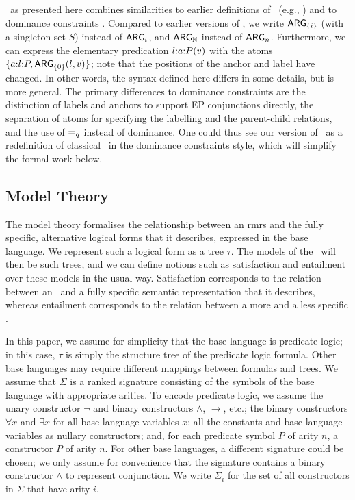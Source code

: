 \rmrs\ as presented here combines similarities to earlier definitions
of \rmrs\ (e.g., \cite{copestake:2003}) and to dominance constraints
\cite{egg:etal:2001}.  Compared to earlier versions of \rmrs, we write
$\mathsf{ARG}_{\{i\}}$ (with a singleton set $S$) instead of $\mathsf{ARG}_i$, and
$\mathsf{ARG}_{\mathbb{N}}$ instead of $\mathsf{ARG}_n$.  Furthermore, we can express the
elementary predication $l {:} a {:} P(v)$ with the atoms
$\{a {:} l {:} P, \mathsf{ARG}_{\{0\}}(l,v)\}$; note that the positions of the
anchor and label have changed.  In other words, the syntax defined
here differs in some details, but is more general. The primary
differences to dominance constraints are the distinction of labels and
anchors to support EP conjunctions directly, the separation of
atoms for specifying the labelling and the parent-child relations, and
the use of $=_q$ instead of dominance.  One could thus see our
version of \rmrs\ as a redefinition of classical \rmrs\ in the
dominance constraints style, which will simplify the formal work
below.




\subsection{Model Theory}

The model theory formalises the relationship between an {\sc rmrs} and
the fully specific, alternative logical forms that it describes,
expressed in the base language.  We represent such a logical form as a
tree $\tau$.  The models of the \rmrs\ will then be such trees, and we
can define notions such as satisfaction and entailment over these
models in the usual way.  Satisfaction corresponds to the relation
between an \rmrs\ and a fully specific semantic representation that it
describes, whereas entailment corresponds to the relation between
a more and a less specific \rmrs.

In this paper, we assume for simplicity that the base language is
predicate logic; in this case, $\tau$ is simply the structure tree of
the predicate logic formula.  Other base languages may require
different mappings between formulas and trees.  We assume that
$\Sigma$ is a ranked signature consisting of the symbols of the base
language with appropriate arities.  To encode predicate logic, we
assume the unary constructor $\neg$ and binary constructors $\wedge$,
$\rightarrow$, etc.; the binary constructors $\forall x$ and $\exists
x$ for all base-language variables $x$; all the constants and
base-language variables as nullary constructors; and, for each
predicate symbol $P$ of arity $n$, a constructor $P$ of arity $n$.
For other base languages, a different signature could be chosen; we
only assume for convenience that the signature contains a binary
constructor $\wedge$ to represent conjunction.  We write $\Sigma_i$
for the set of all constructors in $\Sigma$ that have arity $i$.


